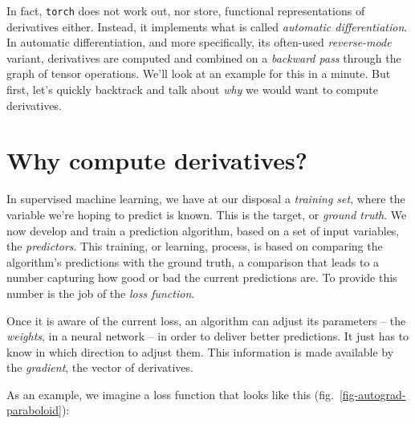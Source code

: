 \documentclass[
  letterpaper,
]{krantz}
\begin{document}
In fact, \texttt{torch} does not work out, nor store, functional
representations of derivatives either. Instead, it implements what is
called \emph{automatic
differentiation}. In automatic
differentiation, and more specifically, its often-used
\emph{reverse-mode} variant, derivatives are computed and combined on a
\emph{backward pass} through the graph of tensor operations. We'll look
at an example for this in a minute. But first, let's quickly backtrack
and talk about \emph{why} we would want to compute derivatives.

\hypertarget{why-compute-derivatives}{%
\section{Why compute derivatives?}\label{why-compute-derivatives}}

In supervised machine learning, we have at our disposal a \emph{training
set}, where the variable we're hoping to predict is known. This is the
target, or \emph{ground truth}. We now develop and train a prediction
algorithm, based on a set of input variables, the \emph{predictors}.
This training, or learning, process, is based on comparing the
algorithm's predictions with the ground truth, a comparison that leads
to a number capturing how good or bad the current predictions are. To
provide this number is the job of the \emph{loss
function}.

Once it is aware of the current loss, an algorithm can adjust its
parameters -- the \emph{weights}, in a neural network -- in order to
deliver better predictions. It just has to know in which direction to
adjust them. This information is made available by the
\emph{gradient}, the vector of
derivatives.

As an example, we imagine a loss function that looks like this
(fig.~\ref{fig-autograd-paraboloid}):
\end{document}
